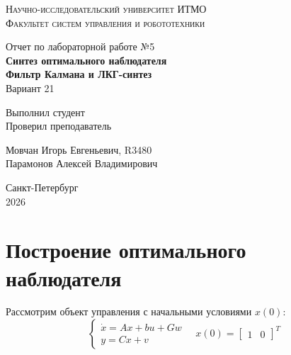 \documentclass[a4paper,hidelinks,14pt]{extarticle}
\begin{document}
	\begin{titlepage}
		\setlength{\parindent}{0ex}
		
		\begin{center}
			\textsc{
				\vspace{1ex}
                Научно-исследовательский университет ИТМО \\
				\vspace{0.5ex}
				Факультет систем управления и робототехники \\
				\vspace{0.5ex}
			}
		\end{center}
		
		\vspace{45mm}
		
		\begin{center}
			Отчет по лабораторной работе №5\\
			\textbf{Синтез оптимального наблюдателя \\
			Фильтр Калмана и ЛКГ-синтез} \\
			Вариант 21
		\end{center}
		
		\vspace{50mm}
		
		\begin{minipage}{.45\linewidth}
			Выполнил студент
            \\
			Проверил преподаватель
		\end{minipage}
		\hfill
		\begin{minipage}{.52\linewidth}
			\begin{flushright}
				Мовчан Игорь Евгеньевич, R3480
                \\
				Парамонов Алексей Владимирович
			\end{flushright}
		\end{minipage}
		
		\vfill
		\begin{center}
			Санкт-Петербург
			\\
			2026
		\end{center}
		
	\end{titlepage}

	\tableofcontents
	\clearpage
	
	\section{Построение оптимального наблюдателя}
	Рассмотрим объект управления с начальными условиями $x(0)$:
	\[
		\begin{cases}
			\dot{x} = Ax + bu + G w \\
			y = Cx + v
		\end{cases}
		\quad x(0) = \begin{bmatrix}
			1 & 0
		\end{bmatrix}^T
	\]
\end{document}

